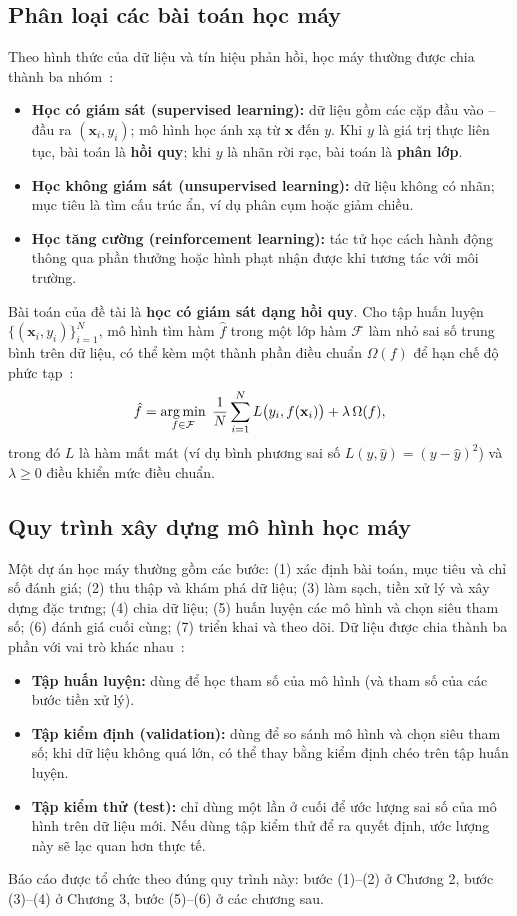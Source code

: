 \documentclass[../main.tex]{subfiles}
\begin{document}
\subsection{Phân loại các bài toán học máy}
Theo hình thức của dữ liệu và tín hiệu phản hồi, học máy thường được chia thành ba nhóm~\cite{russell2020artificial,hastie2009elements}:
\begin{itemize}
    \item \textbf{Học có giám sát (supervised learning):} dữ liệu gồm các cặp đầu vào -- đầu ra $(\mathbf{x}_i, y_i)$; mô hình học ánh xạ từ $\mathbf{x}$ đến $y$. Khi $y$ là giá trị thực liên tục, bài toán là \textbf{hồi quy}; khi $y$ là nhãn rời rạc, bài toán là \textbf{phân lớp}.
    \item \textbf{Học không giám sát (unsupervised learning):} dữ liệu không có nhãn; mục tiêu là tìm cấu trúc ẩn, ví dụ phân cụm hoặc giảm chiều.
    \item \textbf{Học tăng cường (reinforcement learning):} tác tử học cách hành động thông qua phần thưởng hoặc hình phạt nhận được khi tương tác với môi trường.
\end{itemize}
Bài toán của đề tài là \textbf{học có giám sát dạng hồi quy}. Cho tập huấn luyện $\{(\mathbf{x}_i, y_i)\}_{i=1}^{N}$, mô hình tìm hàm $\hat{f}$ trong một lớp hàm $\mathcal{F}$ làm nhỏ sai số trung bình trên dữ liệu, có thể kèm một thành phần điều chuẩn $\Omega(f)$ để hạn chế độ phức tạp~\cite{hastie2009elements}:
\begin{equation}
\hat{f} = \operatorname*{arg\,min}_{f \in \mathcal{F}} \; \frac{1}{N}\sum_{i=1}^{N} L\big(y_i, f(\mathbf{x}_i)\big) + \lambda\, \Omega(f),
\label{eq:erm}
\end{equation}
trong đó $L$ là hàm mất mát (ví dụ bình phương sai số $L(y, \hat{y}) = (y - \hat{y})^2$) và $\lambda \ge 0$ điều khiển mức điều chuẩn.

\subsection{Quy trình xây dựng mô hình học máy}
Một dự án học máy thường gồm các bước: (1) xác định bài toán, mục tiêu và chỉ số đánh giá; (2) thu thập và khám phá dữ liệu; (3) làm sạch, tiền xử lý và xây dựng đặc trưng; (4) chia dữ liệu; (5) huấn luyện các mô hình và chọn siêu tham số; (6) đánh giá cuối cùng; (7) triển khai và theo dõi. Dữ liệu được chia thành ba phần với vai trò khác nhau~\cite{hastie2009elements}:
\begin{itemize}
    \item \textbf{Tập huấn luyện:} dùng để học tham số của mô hình (và tham số của các bước tiền xử lý).
    \item \textbf{Tập kiểm định (validation):} dùng để so sánh mô hình và chọn siêu tham số; khi dữ liệu không quá lớn, có thể thay bằng kiểm định chéo trên tập huấn luyện.
    \item \textbf{Tập kiểm thử (test):} chỉ dùng một lần ở cuối để ước lượng sai số của mô hình trên dữ liệu mới. Nếu dùng tập kiểm thử để ra quyết định, ước lượng này sẽ lạc quan hơn thực tế.
\end{itemize}
Báo cáo được tổ chức theo đúng quy trình này: bước (1)--(2) ở Chương 2, bước (3)--(4) ở Chương 3, bước (5)--(6) ở các chương sau.
\end{document}
